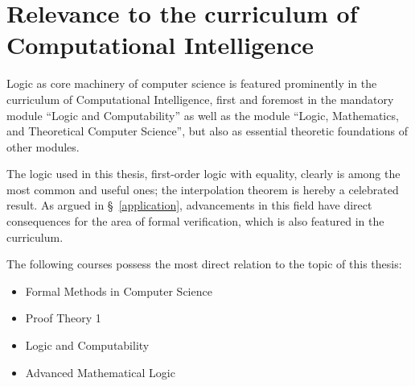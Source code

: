 \documentclass[,%
			paper=a4,%
			DIV10,
			liststotoc,
			bibtotoc,
			draft=false,%
			numbers=noendperiod
			]{scrartcl}
\begin{document}
\section{Relevance to the curriculum of Computational Intelligence}

Logic as core machinery of computer science is featured prominently in the curriculum of Computational Intelligence, first and foremost in the mandatory module ``Logic and Computability'' as well as the module ``Logic, Mathematics, and Theoretical Computer Science'', but also as essential theoretic foundations of other modules. 

The logic used in this thesis, first-order logic with equality, clearly is among the most common and useful ones; the interpolation theorem is hereby a celebrated result.
As argued in \S~\ref{application}, advancements in this field have direct consequences for the area of formal verification, which is also featured in the curriculum.

The following courses possess the most direct relation to the topic of this thesis: 
\begin{itemize}
	\item Formal Methods in Computer Science
	\item Proof Theory 1 
	\item Logic and Computability 
	\item Advanced Mathematical Logic 
\end{itemize}


\nocite{*} %


\end{document}
